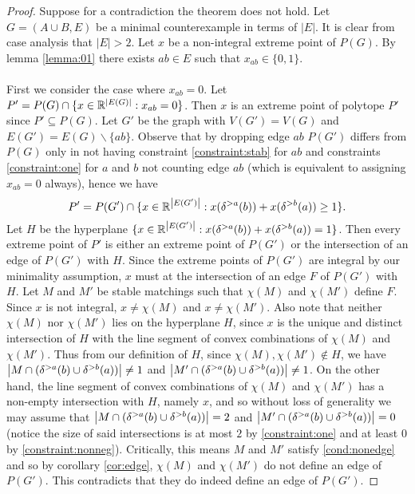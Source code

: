 \begin{proof}
Suppose for a contradiction the theorem does not hold. Let $G=(A\cup B, E)$ be a minimal counterexample in terms of $|E|$. It is clear from case analysis that $|E| > 2$. Let $x$ be a non-integral extreme point of $P(G)$. By lemma \ref{lemma:01} there exists $ab \in E$ such that $x_{ab} \in \{0,1\}$.
\paragraph{}
First we consider the case where $x_{ab} = 0$. Let $P' = P(G) \cap \{x \in \mathbb{R}^{\left|E(G)\right|} : x_{ab} = 0 \}$. Then $x$ is an extreme point of polytope $P'$ since $P' \subseteq P(G)$. Let $G'$ be the graph with $V(G') = V(G)$ and $E(G') = E(G) \backslash \{ab\}$. Observe that by dropping edge $ab$ $P(G')$ differs from $P(G)$ only in not having constraint \ref{constraint:stab} for $ab$ and constraints \ref{constraint:one} for $a$ and $b$ not counting edge $ab$ (which is equivalent to assigning $x_{ab} = 0$ always), hence we have
$$P' = P(G') \cap \{x \in \mathbb{R}^{\left|E(G')\right|} : x(\delta^{>a}(b)) + x(\delta^{>b}(a)) \geq 1 \}.$$
Let $H$ be the hyperplane $\{x \in \mathbb{R}^{\left|E(G')\right|} : x(\delta^{>a}(b)) + x(\delta^{>b}(a)) = 1\}$. Then every extreme point of $P'$ is either an extreme point of $P(G')$ or the intersection of an edge of $P(G')$ with $H$. Since the extreme points of $P(G')$ are integral by our minimality assumption, $x$ must at the intersection of an edge $F$ of $P(G')$ with $H$. Let $M$ and $M'$ be stable matchings such that $\chi(M)$ and $\chi(M')$ define $F$. Since $x$ is not integral, $x \neq \chi(M)$ and $x \neq \chi(M')$. Also note that neither $\chi(M)$ nor $\chi(M')$ lies on the hyperplane $H$, since $x$ is the unique and distinct intersection of $H$ with the line segment of convex combinations of $\chi(M)$ and $\chi(M')$. Thus from our definition of $H$, since $\chi(M), \chi(M') \not\in H$,  we have $\left|M \cap (\delta^{>a}(b) \cup \delta^{>b}(a))\right| \neq 1$ and $\left|M' \cap (\delta^{>a}(b) \cup \delta^{>b}(a))\right| \neq 1$. On the other hand, the line segment of convex combinations of $\chi(M)$ and $\chi(M')$ has a non-empty intersection with $H$, namely $x$,  and so without loss of generality we may assume that $\left|M \cap (\delta^{>a}(b) \cup \delta^{>b}(a))\right| = 2$ and $\left|M' \cap (\delta^{>a}(b) \cup \delta^{>b}(a))\right| = 0$ (notice the size of said intersections is at most $2$ by \ref{constraint:one} and at least $0$ by \ref{constraint:nonneg}). Critically, this means $M$ and $M'$ satisfy \ref{cond:nonedge} and so by corollary \ref{cor:edge}, $\chi(M)$ and $\chi(M')$ do not define an edge of $P(G')$. This contradicts that they do indeed define an edge of $P(G')$.

\end{proof}
